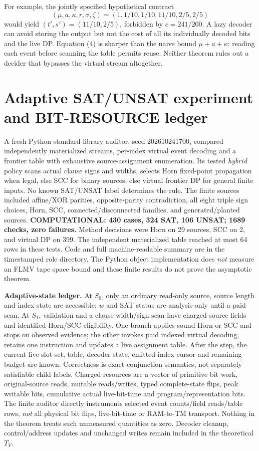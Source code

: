 \documentclass[11pt]{article}
\begin{document}
For example, the jointly specified hypothetical contract
\[
(\mu,a,\kappa,r,\sigma,\zeta)
=(1,1/10,1/10,11/10,2/5,2/5)
\]
would yield $(t',s')=(11/10,2/5)$, forbidden by $c=241/200$. A lazy decoder can avoid storing the output but not the cost of all its individually decoded bits and the live DP. Equation (4) is sharper than the naive bound $\mu+a+\kappa$: reading each event before scanning the table permits reuse. Neither theorem rules out a decider that bypasses the virtual stream altogether.

\section{Adaptive SAT/UNSAT experiment and BIT-RESOURCE ledger}
A fresh Python standard-library auditor, seed 202610241700, compared independently materialized streams, per-index virtual event decoding and a frontier table with exhaustive source-assignment enumeration. Its tested \emph{hybrid} policy scans actual clause signs and widths, selects Horn fixed-point propagation when legal, else SCC for binary sources, else virtual frontier DP for general finite inputs. No known SAT/UNSAT label determines the rule. The finite sources included affine/XOR parities, opposite-parity contradiction, all eight triple sign choices, Horn, SCC, connected/disconnected families, and generated/planted sources. \textbf{COMPUTATIONAL: 430 cases, 324 SAT, 106 UNSAT; 1689 checks, zero failures.} Method decisions were Horn on 29 sources, SCC on 2, and virtual DP on 399. The independent materialized table reached at most 64 rows in these tests. Code and full machine-readable summary are in the timestamped role directory. The Python object implementation does \emph{not} measure an FLMV tape space bound and these finite results do not prove the asymptotic theorem.

\par\noindent\textbf{Adaptive-state ledger.} At $S_0$, only an ordinary read-only source, source length and index state are accessible; $w$ and SAT status are analysis-only until a paid scan. At $S_1$, validation and a clause-width/sign scan have charged source fields and identified Horn/SCC eligibility. One branch applies sound Horn or SCC and stops on observed evidence; the other invokes paid indexed virtual decoding, retains one instruction and updates a live assignment table. After the step, the current live-slot set, table, decoder state, emitted-index cursor and remaining budget are known. Correctness is exact conjunction semantics, not separately satisfiable child labels. Charged resources are a vector of primitive bit work, original-source reads, mutable reads/writes, typed complete-state flips, peak writable bits, cumulative actual live-bit-time and program/representation bits. The finite auditor directly instruments selected event counts/field reads/table rows, \emph{not} all physical bit flips, live-bit-time or RAM-to-TM transport. Nothing in the theorem treats such unmeasured quantities as zero. Decoder cleanup, control/address updates and unchanged writes remain included in the theoretical $T_V$.
\end{document}

